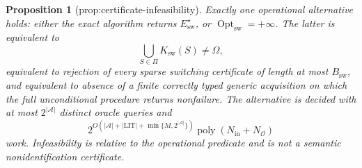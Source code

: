 \documentclass{article}
\newtheorem{proposition}{Proposition}
\begin{document}
\begin{proposition}[prop:certificate-infeasibility]\label{prop:certificate-infeasibility}
Exactly one operational alternative holds: either the exact algorithm returns \(E_{\mathrm{sw}}^{\star}\), or \(\operatorname{Opt}_{\mathrm{sw}}=+\infty\).  The latter is equivalent to
\[
 \bigcup_{S\in\Pi}K_{\mathrm{sw}}(S)\ne\Omega,
\]
equivalent to rejection of every sparse switching certificate of length at most \(B_{\mathrm{sw}}\), and equivalent to absence of a finite correctly typed generic acquisition on which the full unconditional procedure returns nonfailure.  The alternative is decided with at most \(2^{|\mathcal A|}\) distinct oracle queries and
\[
 2^{O(|\mathcal A|+|\mathrm{LIT}|+\min\{M,2^{|\mathcal A|}\})}
 \operatorname{poly}(N_{\mathrm{in}}+N_{\mathcal O})
\]
work.  Infeasibility is relative to the operational predicate and is not a semantic nonidentification certificate.

\end{proposition}
\end{document}
